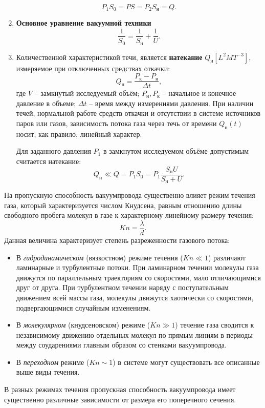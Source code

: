 \documentclass[a4paper, 12pt]{article}
\begin{document}
\begin{enumerate}
\[P_1 S_0 = PS = P_2 S_{\text{н}} = Q. \]
\item \textbf{Основное уравнение вакуумной техники}
\begin{equation}\label{main}
\dfrac{1}{S_0} = \dfrac{1}{S_{ \text{н} }} + \dfrac{1}{U}.
\end{equation}
\item Количественной характеристикой течи, является \textbf{натекание} $Q_н [L^2MT^{-3}]$, измеряемое при отключенных средствах откачки:
\[Q_н = \frac{P_к - P_н}{\Delta{t}},\]
где $V$ -- замкнутый исследуемый объём; $P_н, P_к$ -- начальное и конечное
давление в объеме; $\Delta{t}$ -- время между измерениями давления. При наличии течей, нормальной работе средств откачки и отсутствии в системе источников паров или газов, зависимость потока газа через течь от времени $Q_н(t)$ носит, как правило, линейный характер.

Для заданного давления $P_1$ в замкнутом исследуемом объёме допустимым считается натекание:
\[Q_н \ll Q = P_1S_0 = P_1\frac{S_нU}{S_н + U}.\]
\end{enumerate}

На пропускную способность вакуумпровода существенно влияет
режим течения газа, который характеризуется числом Кнудсена, равным
отношению длины свободного пробега молекул в газе к характерному
линейному размеру течения:
\[Kn = \dfrac{\lambda}{d}.\]
Данная величина характеризует степень разреженности газового
потока:
\begin{itemize}
\item В \textit{гидродинамическом} (вязкостном) режиме течения ($Kn \ll 1$)
различают ламинарные и турбулентные потоки. При ламинарном
течении молекулы газа движутся по параллельным траекториям
со скоростями, мало отличающимися друг от друга. При турбулентном течении наряду с поступательным движением всей массы газа, молекулы движутся хаотически со скоростями, подвергающимися случайным изменениям.
\item В \textit{молекулярном} (кнудсеновском) режиме ($Kn \gg 1$) течение газа
сводится к независимому движению отдельных молекул по прямым линиям в периоды между соударениями главным образом со
стенками вакуумпровода.
\item В \textit{переходном} режиме ($Kn \sim 1$) в системе могут существовать все
описанные выше виды течения.
\end{itemize}

В разных режимах течения пропускная способность вакуумпровода имеет существенно различные зависимости от размера его поперечного сечения.
\end{document}
